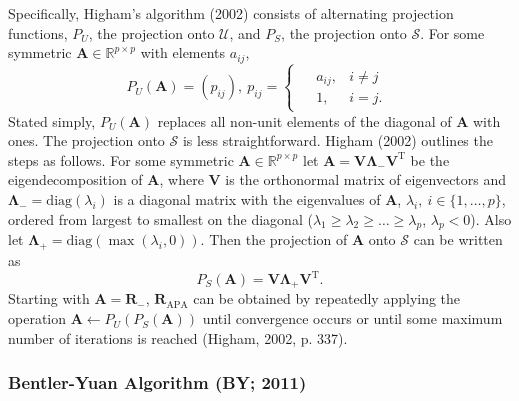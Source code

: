 \documentclass[
  english,
  man]{apa6}
\begin{document}
Specifically, Higham's algorithm (2002) consists of alternating projection functions, \(P_U\), the projection onto \(\mathcal{U}\), and \(P_S\), the projection onto \(\mathcal{S}\). For some symmetric \(\mathbf{A} \in \mathbb{R}^{p \times p}\) with elements \(a_{ij}\),
\begin{equation}
P_U(\mathbf{A}) = (p_{ij}), \: p_{ij} = 
\begin{cases}
\begin{aligned}
&a_{ij}, &i \neq j \\
&1, &i = j.
\end{aligned}
\end{cases}
\label{eq:proj-U}
\end{equation}
Stated simply, \(P_U(\mathbf{A})\) replaces all non-unit elements of the diagonal of \(\mathbf{A}\) with ones. The projection onto \(\mathcal{S}\) is less straightforward. Higham (2002) outlines the steps as follows. For some symmetric \(\mathbf{A} \in \mathbb{R}^{p \times p}\) let \(\mathbf{A} = \mathbf{V} \mathbf{\Lambda}_- \mathbf{V}^{\textrm{T}}\) be the eigendecomposition of \(\mathbf{A}\), where \(\mathbf{V}\) is the orthonormal matrix of eigenvectors and \(\mathbf{\Lambda_-} = \textrm{diag}(\lambda_i)\) is a diagonal matrix with the eigenvalues of \(\mathbf{A}\), \(\lambda_i, \: i \in \{1, \dots, p \}\), ordered from largest to smallest on the diagonal (\(\lambda_1 \geq \lambda_2 \geq \dots \geq \lambda_p\), \(\lambda_p < 0\)). Also let \(\mathbf{\Lambda}_+ = \textrm{diag}(\max(\lambda_i, 0))\). Then the projection of \(\mathbf{A}\) onto \(\mathcal{S}\) can be written as
\begin{equation}
P_S(\mathbf{A}) = \mathbf{V} \mathbf{\Lambda_+} \mathbf{V}^{\textrm{T}}.
\label{eq:proj-S}
\end{equation}
Starting with \(\mathbf{A} = \mathbf{R}_{-}\), \(\mathbf{R}_{\textrm{APA}}\) can be obtained by repeatedly applying the operation \(\mathbf{A} \leftarrow P_U(P_S(\mathbf{A}))\) until convergence occurs or until some maximum number of iterations is reached (Higham, 2002, p. 337).

\hypertarget{bentler-yuan-algorithm-by-2011}{%
\subsubsection{Bentler-Yuan Algorithm (BY; 2011)}\label{bentler-yuan-algorithm-by-2011}}
\end{document}
